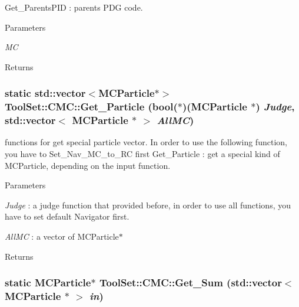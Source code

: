 Get\_\-ParentsPID : parents PDG code. 
\begin{DoxyParams}{Parameters}
\item[{\em MC}]\end{DoxyParams}
\begin{DoxyReturn}{Returns}

\end{DoxyReturn}
\hypertarget{classToolSet_1_1CMC_ae5e3cc992d63d6efb8030bdb170b87d1}{
\subsubsection[{Get\_\-Particle}]{\setlength{\rightskip}{0pt plus 5cm}static std::vector$<$MCParticle$\ast$$>$ ToolSet::CMC::Get\_\-Particle (bool($\ast$)(MCParticle $\ast$) {\em Judge}, \/  std::vector$<$ MCParticle $\ast$ $>$ {\em AllMC})}}
\label{classToolSet_1_1CMC_ae5e3cc992d63d6efb8030bdb170b87d1}


functions for get special particle vector. In order to use the following function, you have to Set\_\-Nav\_\-MC\_\-to\_\-RC first Get\_\-Particle : get a special kind of MCParticle, depending on the input function.


\begin{DoxyParams}{Parameters}
\item[{\em Judge}]: a judge function that provided before, in order to use all functions, you have to set default Navigator first. \item[{\em AllMC}]: a vector of MCParticle$\ast$\end{DoxyParams}
\begin{DoxyReturn}{Returns}

\end{DoxyReturn}
\hypertarget{classToolSet_1_1CMC_a11f6123da1b7a670fc9f22de496affb8}{
\subsubsection[{Get\_\-Sum}]{\setlength{\rightskip}{0pt plus 5cm}static MCParticle$\ast$ ToolSet::CMC::Get\_\-Sum (std::vector$<$ MCParticle $\ast$ $>$ {\em in})}}
\label{classToolSet_1_1CMC_a11f6123da1b7a670fc9f22de496affb8}


